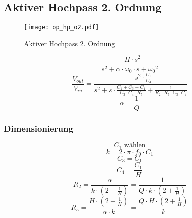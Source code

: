 



\subsection{Aktiver Hochpass 2. Ordnung}
\begin{figure}[h!]
	\centering
	\texttt{[image: op\_hp\_o2.pdf]}
	\caption{Aktiver Hochpass 2. Ordnung}
	\label{sch:op-hp-o2}
\end{figure}
\[ \frac{-H \cdot s^2}{s^2 + \alpha \cdot \omega_0 \cdot s + {\omega_0}^2} \]
\[ \frac{V_{out}}{V_{in}} = \frac{- s^2 \cdot \frac{C_1}{C_4}}
{s^2 + s \cdot \frac{C_1 + C_3 + C_4}{C_3 \cdot C_4 \cdot R_5} 
+ \frac{1}{R_2 \cdot R_5 \cdot C_3 \cdot C_4}} \]
\[ \alpha = \frac{1}{Q} \]
\subsubsection{Dimensionierung}
\[ C_1 \text{ wählen} \]
\[ k = 2 \cdot \pi \cdot f_0 \cdot C_1 \]
\[ C_3 = C_1 \]
\[ C_4 = \frac{C_1}{H} \]
\[ R_2 = \frac{\alpha}{k \cdot \left(2 + \frac{1}{H}\right)} 
= \frac{1}{Q \cdot k \cdot \left(2 + \frac{1}{H}\right)} \]
\[ R_5 = \frac{H \cdot \left(2 + \frac{1}{H}\right)}{\alpha \cdot k} 
= \frac{Q \cdot H \cdot \left(2 + \frac{1}{H}\right)}{k} \]

